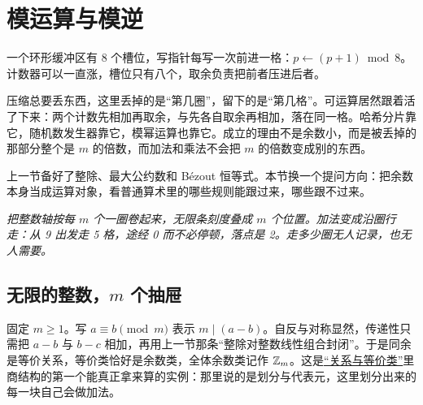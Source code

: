 \section{模运算与模逆}
\label{sec:04-Discrete-Mathematics/04-Number-Theory/02}

一个环形缓冲区有 8 个槽位，写指针每写一次前进一格：\(p\leftarrow(p+1)\bmod 8\)。计数器可以一直涨，槽位只有八个，取余负责把前者压进后者。

压缩总要丢东西，这里丢掉的是``第几圈''，留下的是``第几格''。可运算居然跟着活了下来：两个计数先相加再取余，与先各自取余再相加，落在同一格。哈希分片靠它，随机数发生器靠它，模幂运算也靠它。成立的理由不是余数小，而是被丢掉的那部分整个是 \(m\) 的倍数，而加法和乘法不会把 \(m\) 的倍数变成别的东西。

上一节备好了整除、最大公约数和 Bézout 恒等式。本节换一个提问方向：把余数本身当成运算对象，看普通算术里的哪些规则能跟过来，哪些跟不过来。

\begin{center}

\emph{把整数轴按每 \(m\) 个一圈卷起来，无限条刻度叠成 \(m\) 个位置。加法变成沿圈行走：从 9 出发走 5 格，途经 0 而不必停顿，落点是 2。走多少圈无人记录，也无人需要。}
\end{center}

\subsection{无限的整数，\texorpdfstring{\(m\)}{m} 个抽屉}

固定 \(m\ge1\)。写 \(a\equiv b\pmod m\) 表示 \(m\mid(a-b)\)。自反与对称显然，传递性只需把 \(a-b\) 与 \(b-c\) 相加，再用上一节那条``整除对整数线性组合封闭''。于是同余是等价关系，等价类恰好是余数类，全体余数类记作 \(\mathbb{Z}_m\)。这是\hyperref[sec:01-Mathematical-Language/02-Sets-Relations-Functions/02]{``关系与等价类''}里商结构的第一个能真正拿来算的实例：那里说的是划分与代表元，这里划分出来的每一块自己会做加法。

